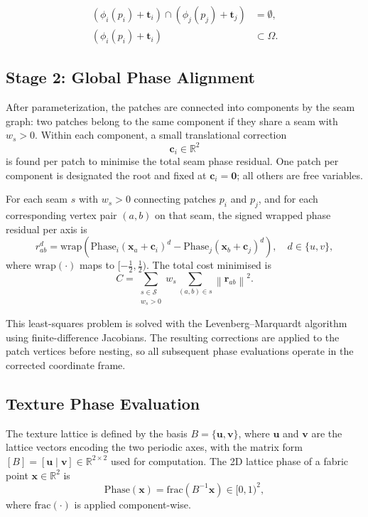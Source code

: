 \documentclass[runningheads]{llncs}
\begin{document}
\begin{align}
(\phi_i(p_i) + \mathbf{t}_i) \cap (\phi_j(p_j) + \mathbf{t}_j) &= \emptyset, \\
(\phi_i(p_i) + \mathbf{t}_i) &\subset \Omega.
\end{align}

\subsection{Stage 2: Global Phase Alignment}

After parameterization, the patches are connected into components by the seam graph:
two patches belong to the same component if they share a seam with $w_s > 0$.
Within each component, a small translational correction
\[
\mathbf{c}_i \in \mathbb{R}^2
\]
is found per patch to minimise the total seam phase residual.
One patch per component is designated the root and fixed at $\mathbf{c}_i = \mathbf{0}$;
all others are free variables.

For each seam $s$ with $w_s > 0$ connecting patches $p_i$ and $p_j$,
and for each corresponding vertex pair $(a, b)$ on that seam,
the signed wrapped phase residual per axis is
\[
r^d_{ab}
= \mathrm{wrap}\!\left(
    \mathrm{Phase}_i(\mathbf{x}_a + \mathbf{c}_i)^d
  - \mathrm{Phase}_j(\mathbf{x}_b + \mathbf{c}_j)^d
\right), \quad d \in \{u, v\},
\]
where $\mathrm{wrap}(\cdot)$ maps to $[-\tfrac{1}{2}, \tfrac{1}{2})$.
The total cost minimised is
\[
C = \sum_{\substack{s \in \mathcal{S} \\ w_s > 0}}
    w_s \sum_{(a,b) \in s} \left\|\mathbf{r}_{ab}\right\|^2.
\]

This least-squares problem is solved with the Levenberg--Marquardt algorithm
using finite-difference Jacobians.
The resulting corrections are applied to the patch vertices before nesting,
so all subsequent phase evaluations operate in the corrected coordinate frame.

\subsection{Texture Phase Evaluation}

The texture lattice is defined by the basis $B = \{\mathbf{u}, \mathbf{v}\}$,
where $\mathbf{u}$ and $\mathbf{v}$ are the lattice vectors encoding the two periodic axes,
with the matrix form $[B] = [\mathbf{u} \mid \mathbf{v}] \in \mathbb{R}^{2 \times 2}$ used for computation.
The 2D lattice phase of a fabric point $\mathbf{x} \in \mathbb{R}^2$ is
\[
\mathrm{Phase}(\mathbf{x}) = \mathrm{frac}(B^{-1}\mathbf{x}) \in [0,1)^2,
\]
where $\mathrm{frac}(\cdot)$ is applied component-wise.
\end{document}
